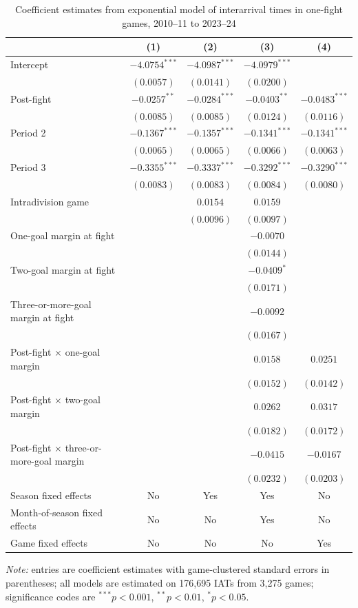 \begin{table}[!h]
\centering
\caption{Coefficient estimates from exponential model of interarrival times in one-fight games, 2010--11 to 2023--24}
\label{tab:iat_regression_20102011_20232024}
\scriptsize
\renewcommand{\arraystretch}{1.12}
\setlength{\tabcolsep}{5pt}

\begin{tabular*}{\textwidth}{@{\extracolsep{\fill}}lcccc}
\toprule
 & (1) & (2) & (3) & (4) \\
\midrule
Intercept & $-4.0754^{***}$ & $-4.0987^{***}$ & $-4.0979^{***}$ &  \\
 & $(0.0057)$ & $(0.0141)$ & $(0.0200)$ &  \\
Post-fight & $-0.0257^{**}$ & $-0.0284^{***}$ & $-0.0403^{**}$ & $-0.0483^{***}$ \\
 & $(0.0085)$ & $(0.0085)$ & $(0.0124)$ & $(0.0116)$ \\
Period 2 & $-0.1367^{***}$ & $-0.1357^{***}$ & $-0.1341^{***}$ & $-0.1341^{***}$ \\
 & $(0.0065)$ & $(0.0065)$ & $(0.0066)$ & $(0.0063)$ \\
Period 3 & $-0.3355^{***}$ & $-0.3337^{***}$ & $-0.3292^{***}$ & $-0.3290^{***}$ \\
 & $(0.0083)$ & $(0.0083)$ & $(0.0084)$ & $(0.0080)$ \\
Intradivision game &  & $0.0154$ & $0.0159$ &  \\
 &  & $(0.0096)$ & $(0.0097)$ &  \\
One-goal margin at fight &  &  & $-0.0070$ &  \\
 &  &  & $(0.0144)$ &  \\
Two-goal margin at fight &  &  & $-0.0409^{*}$ &  \\
 &  &  & $(0.0171)$ &  \\
Three-or-more-goal margin at fight &  &  & $-0.0092$ &  \\
 &  &  & $(0.0167)$ &  \\
Post-fight $\times$ one-goal margin &  &  & $0.0158$ & $0.0251$ \\
 &  &  & $(0.0152)$ & $(0.0142)$ \\
Post-fight $\times$ two-goal margin &  &  & $0.0262$ & $0.0317$ \\
 &  &  & $(0.0182)$ & $(0.0172)$ \\
Post-fight $\times$ three-or-more-goal margin &  &  & $-0.0415$ & $-0.0167$ \\
 &  &  & $(0.0232)$ & $(0.0203)$ \\
\midrule
Season fixed effects & No & Yes & Yes & No \\
Month-of-season fixed effects & No & No & Yes & No \\
Game fixed effects & No & No & No & Yes \\
\bottomrule
\end{tabular*}

\vspace{0.4em}
\parbox{0.95\textwidth}{
\footnotesize
\textit{Note:} entries are coefficient estimates with game-clustered standard errors in parentheses; all models are estimated on 176,695 IATs from 3,275 games; significance codes are $^{***}p<0.001$, $^{**}p<0.01$, $^{*}p<0.05$.
}
\end{table}

